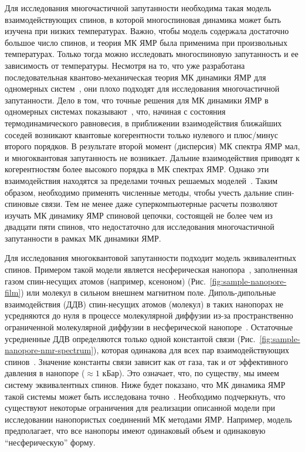 Для исследования многочастичной запутанности необходима такая модель взаимодействующих спинов,
в которой многоспиновая динамика может быть изучена при низких температурах.
Важно, чтобы модель содержала достаточно большое число спинов,
и теория МК ЯМР была применима при произвольных температурах.
Только тогда можно исследовать многоспиновую запутанность и ее зависимость от температуры.
Несмотря на то, что уже разработана последовательная квантово-механическая теория МК динамики ЯМР для одномерных систем~\cite{Feldman1996, Feldman1997, Doronin2000},
они плохо подходят для исследования многочастичной запутанности.
Дело в том, что точные решения для МК динамики ЯМР в одномерных системах показывают~\cite{Feldman1996, Feldman1997, Doronin2000},
что, начиная с состояния термодинамического равновесия,
в приближении взаимодействия ближайших соседей возникают квантовые когерентности только нулевого и плюс/минус второго порядков.
В результате второй момент (дисперсия) МК спектра ЯМР мал, и многоквантовая запутанность не возникает.
Дальние взаимодействия приводят к когерентностям более высокого порядка в МК спектрах ЯМР.
Однако эти взаимодействия находятся за пределами точных решаемых моделей~\cite{Munowitz1987, Alvarez2015, Wei2018}.
Таким образом, необходимо применять численные методы, чтобы учесть дальние спин-спиновые связи.
Тем не менее даже суперкомпьютерные расчеты позволяют изучать МК динамику ЯМР спиновой цепочки,
состоящей не более чем из двадцати пяти спинов,
что недостаточно для исследования многочастичной запутанности в рамках МК динамики ЯМР.

Для исследования многоквантовой запутанности подходит модель эквивалентных спинов.
Примером такой модели является  несферическая нанопора~\cite{Baugh2001},
заполненная газом спин-несущих атомов (например, ксеноном) (Рис.~\ref{fig:sample-nanopore-film})
или молекул в сильном внешнем магнитном поле.
Диполь-дипольные взаимодействия (ДДВ) спин-несущих атомов (молекул) в таких нанопорах не усредняются до нуля
в процессе молекулярной диффузии из-за пространственно ограниченной молекулярной диффузии в несферической нанопоре~\cite{Baugh2001, Feldman2004}.
Остаточные усредненные ДДВ определяются только одной константой связи (Рис.~\ref{fig:sample-nanopore-nmr-spectrum}),
которая одинакова для всех пар взаимодействующих спинов~\cite{Baugh2001, Feldman2004}.
Значение константы связи зависит как от газа,
так и от эффективного давления в нанопоре ($\approx 1$ кБар).
Это означает, что, по существу, мы имеем систему эквивалентных спинов.
Ниже будет показано, что МК динамика ЯМР такой системы может быть исследована точно~\cite{Doronin2009}.
Необходимо подчеркнуть,
что существуют некоторые ограничения для реализации описанной модели
при исследовании нанопористых соединений МК методами ЯМР.
Например, модель предполагает, что все нанопоры имеют одинаковый объем и одинаковую ``несферическую'' форму.


